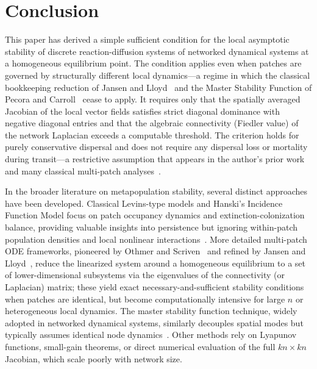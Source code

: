 \documentclass[12pt,a4paper]{article}
\theoremstyle{definition}
\begin{document}
\section{Conclusion}
\label{sec:conclusion}

This paper has derived a simple sufficient condition for the local asymptotic stability of discrete reaction-diffusion systems of networked dynamical systems at a homogeneous equilibrium point. The condition applies even when patches are governed by structurally different local dynamics---a regime in which the classical bookkeeping reduction of Jansen and Lloyd~\cite{jansen2000} and the Master Stability Function of Pecora and Carroll~\cite{pecora1998} cease to apply. It requires only that the spatially averaged Jacobian of the local vector fields satisfies strict diagonal dominance with negative diagonal entries and that the algebraic connectivity (Fiedler value) of the network Laplacian exceeds a computable threshold. The criterion holds for purely conservative dispersal and does not require any dispersal loss or mortality during transit---a restrictive assumption that appears in the author's prior work~\cite{kumar2019,kumar2021} and many classical multi-patch analyses~\cite{ruxton1997,briggs2004}.

In the broader literature on metapopulation stability, several distinct approaches have been developed. Classical Levins-type models and Hanski's Incidence Function Model focus on patch occupancy dynamics and extinction-colonization balance, providing valuable insights into persistence but ignoring within-patch population densities and local nonlinear interactions~\cite{hanski1999}. More detailed multi-patch ODE frameworks, pioneered by Othmer and Scriven~\cite{othmer1971} and refined by Jansen and Lloyd~\cite{jansen2000}, reduce the linearized system around a homogeneous equilibrium to a set of lower-dimensional subsystems via the eigenvalues of the connectivity (or Laplacian) matrix; these yield exact necessary-and-sufficient stability conditions when patches are identical, but become computationally intensive for large \(n\) or heterogeneous local dynamics. The master stability function technique, widely adopted in networked dynamical systems, similarly decouples spatial modes but typically assumes identical node dynamics~\cite{pecora1998}. Other methods rely on Lyapunov functions, small-gain theorems, or direct numerical evaluation of the full \(kn \times kn\) Jacobian, which scale poorly with network size.
\end{document}
